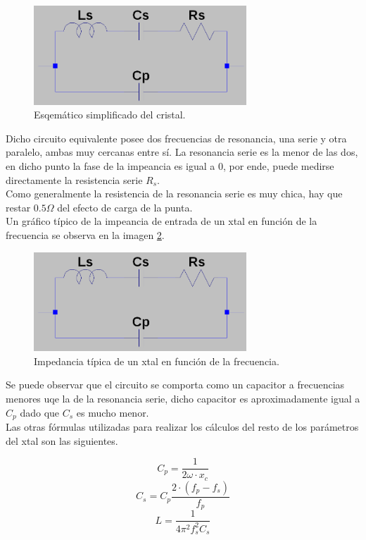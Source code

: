 \documentclass[a4paper,10pt]{article}
\begin{document}
		\begin{figure}[!htb]
			\centering
			\includegraphics[width=8cm]{Imagenes/esqXtal.png}
			\caption{Esqemático simplificado del cristal.}
			\label{img004} 
		\end{figure}

		\indent Dicho circuito equivalente posee dos frecuencias de resonancia,
		una serie y otra paralelo, ambas muy cercanas entre sí. La resonancia 
		serie es la menor de las dos, en dicho punto la fase de la impeancia es
		igual a 0, por ende, puede medirse directamente la resistencia serie 
		$R_s$. \\
		\indent Como generalmente la resistencia de la resonancia serie es muy 
		chica, hay que restar $0.5\Omega$ del efecto de carga de la punta. \\
		\indent Un gráfico típico de la impeancia de entrada de un xtal en 
		función de la frecuencia se observa en la imagen \ref{img005}.
		\begin{figure}[!htb]
			\centering
			\includegraphics[width=8cm]{Imagenes/esqXtal.png}
			\caption{Impedancia típica de un xtal en función de la frecuencia.}
			\label{img005} 
		\end{figure}

		\indent Se puede observar que el circuito se comporta como un capacitor
		a frecuencias menores uqe la de la resonancia serie, dicho capacitor es 
		aproximadamente igual a $C_p$ dado que $C_s$ es mucho menor. \\
		\indent Las otras fórmulas utilizadas para realizar los cálculos del 
		resto de los parámetros del xtal son las siguientes.
		
		$$C_p = \frac{1}{2\omega\cdot x_c}$$
		$$C_s = C_p \frac{2\cdot(f_p - f_s)}{f_p}$$
		$$L = \frac{1}{4\pi^2f_s^2C_s}$$
\end{document}
